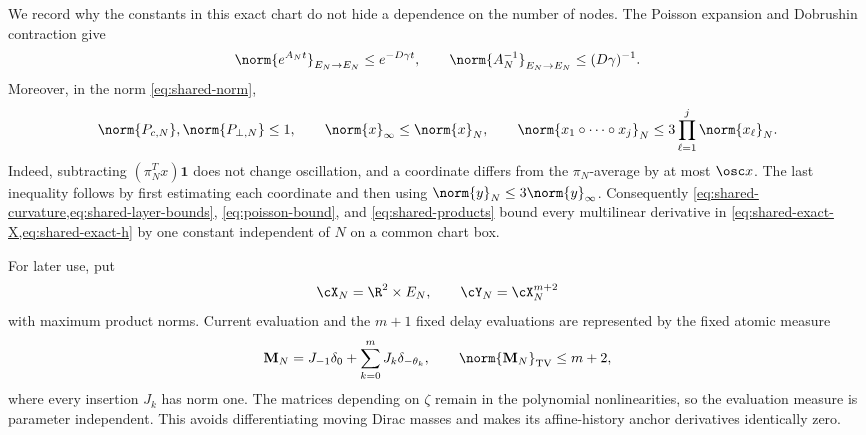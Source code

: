 We record why the constants in this exact chart do not hide a dependence on
the number of nodes.  The Poisson expansion and Dobrushin contraction give
\begin{equation}
 \norm{e^{A_Nt}}_{E_N\to E_N}\le e^{-D\gamma t},
 \qquad \norm{A_N^{-1}}_{E_N\to E_N}\le(D\gamma)^{-1}.
                                                               \label{eq:poisson-bound}
\end{equation}
Moreover, in the norm \cref{eq:shared-norm},
\begin{equation}
 \norm{P_{c,N}},\norm{P_{\perp,N}}\le1,\qquad
 \norm{x}_\infty\le\norm{x}_N,\qquad
 \norm{x_1\circ\cdots\circ x_j}_N
 \le3\prod_{\ell=1}^j\norm{x_\ell}_N.               \label{eq:shared-products}
\end{equation}
Indeed, subtracting \((\pi_N^Tx)\mathbf1\) does not change oscillation,
and a coordinate differs from the \(\pi_N\)-average by at most
\(\osc x\).  The last inequality follows by first estimating each
coordinate and then using \(\norm{y}_N\le3\norm{y}_\infty\).
Consequently \cref{eq:shared-curvature,eq:shared-layer-bounds},
\cref{eq:poisson-bound}, and \cref{eq:shared-products} bound every
multilinear derivative in \cref{eq:shared-exact-X,eq:shared-exact-h} by one
constant independent of \(N\) on a common chart box.

For later use, put
\[
 \cX_N=\R^2\times E_N,
 \qquad
 \cY_N=\cX_N^{m+2}
\]
with maximum product norms.  Current evaluation and the \(m+1\) fixed
delay evaluations are represented by the fixed atomic measure
\begin{equation}
 \mathbf M_N=J_{-1}\delta_0+\sum_{k=0}^mJ_k\delta_{-\theta_k},
 \qquad \norm{\mathbf M_N}_{\rm TV}\le m+2,           \label{eq:shared-evaluation-TV}
\end{equation}
where every insertion \(J_k\) has norm one.  The matrices depending on
\(\zeta\) remain in the polynomial nonlinearities, so the evaluation
measure is parameter independent.  This avoids differentiating moving
Dirac masses and makes its affine-history anchor derivatives identically
zero.

